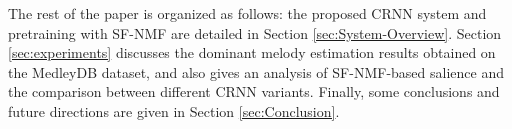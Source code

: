 \documentclass{article}
\newcommand{\gp}[1]{{\textcolor{black}{#1}}}
\begin{document}
The rest of the paper is organized as follows: the proposed CRNN system and pretraining with SF-NMF are detailed in Section \ref{sec:System-Overview}. Section \ref{sec:experiments} discusses the dominant melody estimation results obtained on the MedleyDB dataset, and also gives an analysis of SF-NMF-based salience and the comparison between different CRNN variants. Finally, some conclusions and future directions are given in Section \ref{sec:Conclusion}.




\end{document}
